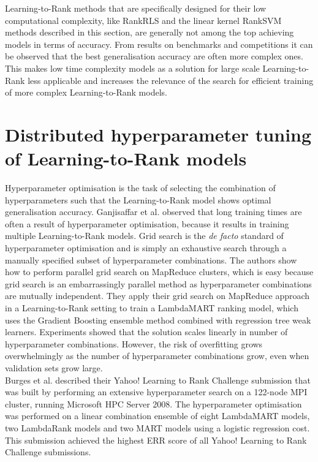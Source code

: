 Learning-to-Rank methods that are specifically designed for their low computational complexity, like RankRLS and the linear kernel Rank\ac{SVM} methods described in this section, are generally not among the top achieving models in terms of accuracy. From results on benchmarks and competitions it can be observed that the best generalisation accuracy are often more complex ones. This makes low time complexity models as a solution for large scale Learning-to-Rank less applicable and increases the relevance of the search for efficient training of more complex Learning-to-Rank models.\\ 

\section{Distributed hyperparameter tuning of Learning-to-Rank models}
Hyperparameter optimisation is the task of selecting the combination of hyperparameters such that the Learning-to-Rank model shows optimal generalisation accuracy. Ganjisaffar et al. \cite{Ganjisaffar2011, Ganjisaffar2011b} observed that long training times are often a result of hyperparameter optimisation, because it results in training multiple Learning-to-Rank models. Grid search is the \emph{de facto} standard of hyperparameter optimisation and is simply an exhaustive search through a manually specified subset of hyperparameter combinations. The authors show how to perform parallel grid search on MapReduce clusters, which is easy because grid search is an embarrassingly parallel method as hyperparameter combinations are mutually independent. They apply their grid search on MapReduce approach in a Learning-to-Rank setting to train a LambdaMART \cite{Wu2008} ranking model, which uses the Gradient Boosting \cite{Friedman2002} ensemble method combined with regression tree weak learners. Experiments showed that the solution scales linearly in number of hyperparameter combinations. However, the risk of overfitting grows overwhelmingly as the number of hyperparameter combinations grow, even when validation sets grow large.\\

Burges et al. \cite{Burges2011} described their Yahoo! Learning to Rank Challenge submission that was built by performing an extensive hyperparameter search on a 122-node MPI cluster, running Microsoft HPC Server 2008. The hyperparameter optimisation was performed on a linear combination ensemble of eight LambdaMART models, two LambdaRank models and two MART models using a logistic regression cost. This submission achieved the highest \ac{ERR} score of all Yahoo! Learning to Rank Challenge submissions.\\

